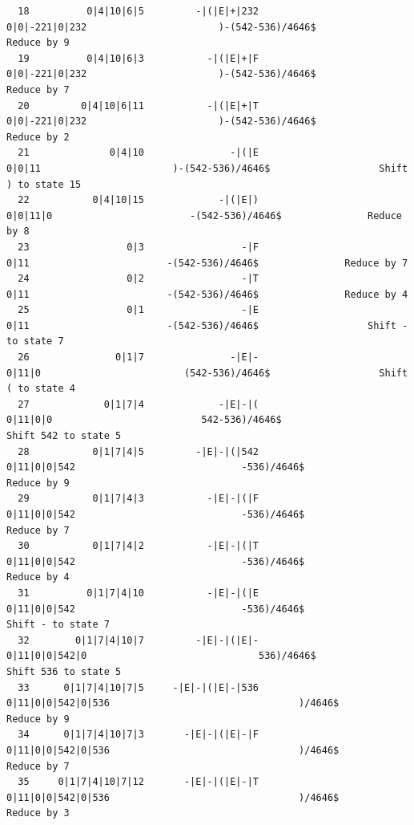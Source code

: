 \documentclass[UTF8]{ctexart}
\begin{document}
\begin{lstlisting}
  18          0|4|10|6|5         -|(|E|+|232                0|0|-221|0|232                       )-(542-536)/4646$               Reduce by 9
  19          0|4|10|6|3           -|(|E|+|F                0|0|-221|0|232                       )-(542-536)/4646$               Reduce by 7
  20         0|4|10|6|11           -|(|E|+|T                0|0|-221|0|232                       )-(542-536)/4646$               Reduce by 2
  21              0|4|10               -|(|E                        0|0|11                       )-(542-536)/4646$                   Shift ) to state 15
  22           0|4|10|15             -|(|E|)                      0|0|11|0                        -(542-536)/4646$               Reduce by 8
  23                 0|3                 -|F                          0|11                        -(542-536)/4646$               Reduce by 7
  24                 0|2                 -|T                          0|11                        -(542-536)/4646$               Reduce by 4
  25                 0|1                 -|E                          0|11                        -(542-536)/4646$                   Shift - to state 7
  26               0|1|7               -|E|-                        0|11|0                         (542-536)/4646$                   Shift ( to state 4
  27             0|1|7|4             -|E|-|(                      0|11|0|0                          542-536)/4646$                   Shift 542 to state 5
  28           0|1|7|4|5         -|E|-|(|542                  0|11|0|0|542                             -536)/4646$               Reduce by 9
  29           0|1|7|4|3           -|E|-|(|F                  0|11|0|0|542                             -536)/4646$               Reduce by 7
  30           0|1|7|4|2           -|E|-|(|T                  0|11|0|0|542                             -536)/4646$               Reduce by 4
  31          0|1|7|4|10           -|E|-|(|E                  0|11|0|0|542                             -536)/4646$                   Shift - to state 7
  32        0|1|7|4|10|7         -|E|-|(|E|-                0|11|0|0|542|0                              536)/4646$                   Shift 536 to state 5
  33      0|1|7|4|10|7|5     -|E|-|(|E|-|536            0|11|0|0|542|0|536                                 )/4646$               Reduce by 9
  34      0|1|7|4|10|7|3       -|E|-|(|E|-|F            0|11|0|0|542|0|536                                 )/4646$               Reduce by 7
  35     0|1|7|4|10|7|12       -|E|-|(|E|-|T            0|11|0|0|542|0|536                                 )/4646$               Reduce by 3

\end{lstlisting}
\end{document}
